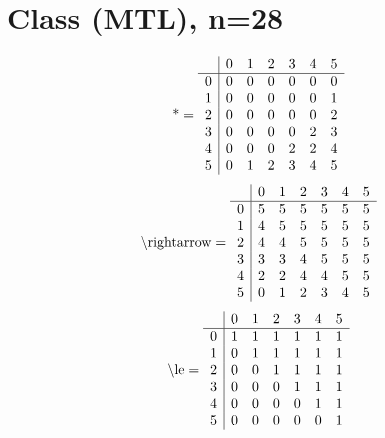 \documentclass[11pt]{article}
\begin{document}
\section{Class (MTL), n=28}
\[\text{*} = 
\begin{array}{r | r r r r r r}
 & 0 & 1 & 2 & 3 & 4 & 5 \\ \hline
0 & 0 & 0 & 0 & 0 & 0 & 0 \\
1 & 0 & 0 & 0 & 0 & 0 & 1 \\
2 & 0 & 0 & 0 & 0 & 0 & 2 \\
3 & 0 & 0 & 0 & 0 & 2 & 3 \\
4 & 0 & 0 & 0 & 2 & 2 & 4 \\
5 & 0 & 1 & 2 & 3 & 4 & 5 \\
\end{array}
\]
\[\text{\textbackslash rightarrow} = 
\begin{array}{r | r r r r r r}
 & 0 & 1 & 2 & 3 & 4 & 5 \\ \hline
0 & 5 & 5 & 5 & 5 & 5 & 5 \\
1 & 4 & 5 & 5 & 5 & 5 & 5 \\
2 & 4 & 4 & 5 & 5 & 5 & 5 \\
3 & 3 & 3 & 4 & 5 & 5 & 5 \\
4 & 2 & 2 & 4 & 4 & 5 & 5 \\
5 & 0 & 1 & 2 & 3 & 4 & 5 \\
\end{array}
\]
\[\text{\textbackslash le} = 
\begin{array}{r | r r r r r r}
 & 0 & 1 & 2 & 3 & 4 & 5 \\ \hline
0 & 1 & 1 & 1 & 1 & 1 & 1 \\
1 & 0 & 1 & 1 & 1 & 1 & 1 \\
2 & 0 & 0 & 1 & 1 & 1 & 1 \\
3 & 0 & 0 & 0 & 1 & 1 & 1 \\
4 & 0 & 0 & 0 & 0 & 1 & 1 \\
5 & 0 & 0 & 0 & 0 & 0 & 1 \\
\end{array}
\]
\end{document}

